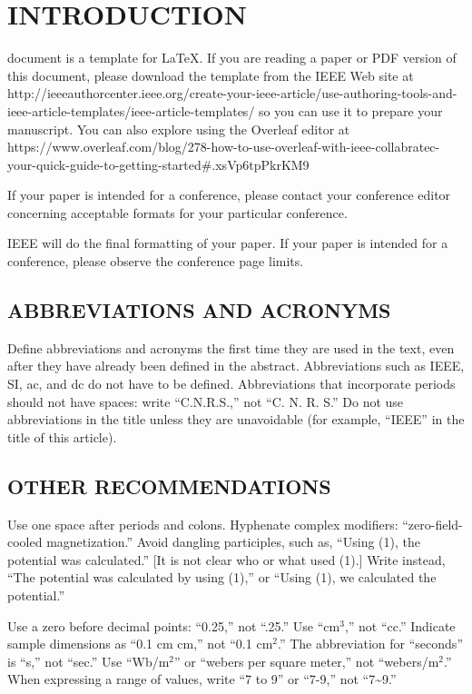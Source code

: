 \documentclass{ieeetj}
\begin{document}
\section{INTRODUCTION}
 document is a template for \LaTeX. If you are
reading a paper or PDF version of this document, please download the
template from the IEEE Web site at 
http://\discretionary{}{}{}ieeeauthorcenter.ieee.org/\discretionary{}{}{}create-your-ieee-article/\discretionary{}{}{}use-authoring-tools-and-ieee-article-templates/\discretionary{}{}{}ieee-article-templates/
so you can use it to prepare your manuscript.
You can also explore using the Overleaf editor at
https://\discretionary{}{}{}www.overleaf.com/\discretionary{}{}{}blog/\discretionary{}{}{}278-how-to-use-overleaf-with-ieee-collabratec-your-quick-guide-to-getting-started\discretionary{}{}{}\#.xsVp6tpPkrKM9

If your paper is intended for a conference, please contact your conference
editor concerning acceptable formats for your particular
conference.

IEEE will do the final formatting of your paper. If your paper is intended
for a conference, please observe the conference page limits.

\subsection{ABBREVIATIONS AND ACRONYMS}
Define abbreviations and acronyms the first time they are used in the text,
even after they have already been defined in the abstract. Abbreviations
such as IEEE, SI, ac, and dc do not have to be defined. Abbreviations that
incorporate periods should not have spaces: write ``C.N.R.S.,'' not ``C. N.
R. S.'' Do not use abbreviations in the title unless they are unavoidable
(for example, ``IEEE'' in the title of this article).

\subsection{OTHER RECOMMENDATIONS}
Use one space after periods and colons. Hyphenate complex modifiers:
``zero-field-cooled magnetization.'' Avoid dangling participles, such as,
``Using (1), the potential was calculated.'' [It is not clear who or what
used (1).] Write instead, ``The potential was calculated by using (1),'' or
``Using (1), we calculated the potential.''

Use a zero before decimal points: ``0.25,'' not ``.25.'' Use ``cm$^3$,'' not
``cc.'' Indicate sample dimensions as ``0.1 cm  cm,'' not
``0.1  cm$^{2}$.'' The abbreviation for ``seconds'' is ``s,''
not ``sec.'' Use ``Wb/m$^{2}$'' or ``webers per square meter,'' not
``webers/m$^2$.'' When expressing a range of values, write ``7 to 9'' or
``7-9,'' not ``7\textasciitilde 9.''
\end{document}
